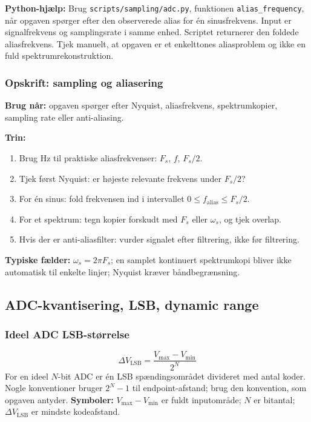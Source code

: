 \textbf{Python-hjælp:} Brug \texttt{scripts/sampling/adc.py}, funktionen \texttt{alias\_frequency}, når opgaven spørger efter den observerede alias for én sinusfrekvens. Input er signalfrekvens og samplingsrate i samme enhed. Scriptet returnerer den foldede aliasfrekvens. Tjek manuelt, at opgaven er et enkelttones aliasproblem og ikke en fuld spektrumrekonstruktion.

\subsubsection{Opskrift: sampling og aliasering}
\textbf{Brug når:} opgaven spørger efter Nyquist, aliasfrekvens, spektrumkopier, sampling rate eller anti-aliasing.

\textbf{Trin:}
\begin{enumerate}
    \item Brug Hz til praktiske aliasfrekvenser: \(F_s\), \(f\), \(F_s/2\).
    \item Tjek først Nyquist: er højeste relevante frekvens under \(F_s/2\)?
    \item For én sinus: fold frekvensen ind i intervallet \(0\le f_{\mathrm{alias}}\le F_s/2\).
    \item For et spektrum: tegn kopier forskudt med \(F_s\) eller \(\omega_s\), og tjek overlap.
    \item Hvis der er anti-aliasfilter: vurder signalet efter filtrering, ikke før filtrering.
\end{enumerate}

\textbf{Typiske fælder:} \(\omega_s=2\pi F_s\); en samplet kontinuert spektrumkopi bliver ikke automatisk til enkelte linjer; Nyquist kræver båndbegrænsning.

\subsection{ADC-kvantisering, LSB, dynamic range}

\subsubsection{Ideel ADC LSB-størrelse}
\[
\Delta V_{\mathrm{LSB}}=\frac{V_{\max}-V_{\min}}{2^N}
\]
For en ideel \(N\)-bit ADC er én LSB spændingsområdet divideret med antal koder. Nogle konventioner bruger \(2^N-1\) til endpoint-afstand; brug den konvention, som opgaven antyder.
\textbf{Symboler:} \(V_{\max}-V_{\min}\) er fuldt inputområde; \(N\) er bitantal; \(\Delta V_{\mathrm{LSB}}\) er mindste kodeafstand.

